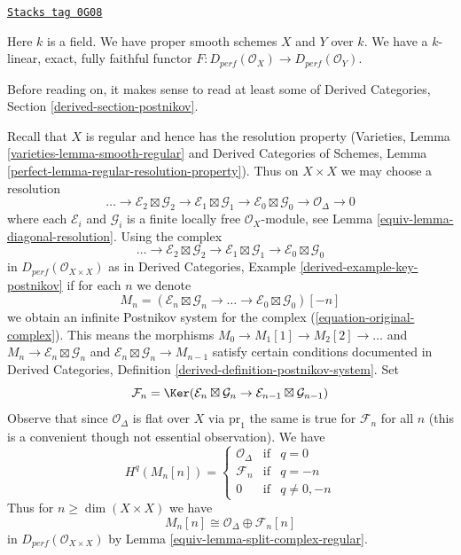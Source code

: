 \begin{definition}
\label{equiv-situation-fully-faithful}
\href{https://stacks.math.columbia.edu/tag/0G08}{\texttt{Stacks tag 0G08}}

Here $k$ is a field. We have proper smooth schemes $X$ and $Y$ over $k$.
We have a $k$-linear, exact, fully faithful functor
$F : D_{perf}(\mathcal{O}_X) \to D_{perf}(\mathcal{O}_Y)$.
\end{definition}

Before reading on, it makes sense to read at least some of
Derived Categories, Section \ref{derived-section-postnikov}.

\medskip\noindent
Recall that $X$ is regular and hence has the resolution property
(Varieties, Lemma \ref{varieties-lemma-smooth-regular} and
Derived Categories of Schemes, Lemma
\ref{perfect-lemma-regular-resolution-property}). Thus
on $X \times X$ we may choose a resolution
$$
\ldots \to
\mathcal{E}_2 \boxtimes \mathcal{G}_2 \to
\mathcal{E}_1 \boxtimes \mathcal{G}_1 \to
\mathcal{E}_0 \boxtimes \mathcal{G}_0 \to
\mathcal{O}_\Delta \to 0
$$
where each $\mathcal{E}_i$ and $\mathcal{G}_i$ is a finite locally
free $\mathcal{O}_X$-module, see Lemma \ref{equiv-lemma-diagonal-resolution}.
Using the complex
\begin{equation}
\label{equation-original-complex}
\ldots \to
\mathcal{E}_2 \boxtimes \mathcal{G}_2 \to
\mathcal{E}_1 \boxtimes \mathcal{G}_1 \to
\mathcal{E}_0 \boxtimes \mathcal{G}_0
\end{equation}
in $D_{perf}(\mathcal{O}_{X \times X})$ as in
Derived Categories, Example \ref{derived-example-key-postnikov}
if for each $n$ we denote
$$
M_n = (\mathcal{E}_n \boxtimes \mathcal{G}_n \to \ldots \to
\mathcal{E}_0 \boxtimes \mathcal{G}_0)[-n]
$$
we obtain an infinite Postnikov system for the complex
(\ref{equation-original-complex}). This means
the morphisms $M_0 \to M_1[1] \to M_2[2] \to \ldots$ and
$M_n \to \mathcal{E}_n \boxtimes \mathcal{G}_n$ and
$\mathcal{E}_n \boxtimes \mathcal{G}_n \to M_{n - 1}$
satisfy certain conditions documented in
Derived Categories, Definition \ref{derived-definition-postnikov-system}.
Set
$$
\mathcal{F}_n = \Ker(\mathcal{E}_n \boxtimes \mathcal{G}_n \to
\mathcal{E}_{n - 1} \boxtimes \mathcal{G}_{n - 1})
$$
Observe that since $\mathcal{O}_\Delta$ is flat over $X$ via $\text{pr}_1$
the same is true for $\mathcal{F}_n$ for all $n$ (this is a convenient though
not essential observation). We have
$$
H^q(M_n[n]) = \left\{
\begin{matrix}
\mathcal{O}_\Delta & \text{if} & q = 0 \\
\mathcal{F}_n & \text{if} & q = -n \\
0 & \text{if} & q \not = 0, -n
\end{matrix}
\right.
$$
Thus for $n \geq \dim(X \times X)$ we have
$$
M_n[n] \cong \mathcal{O}_\Delta \oplus \mathcal{F}_n[n]
$$
in $D_{perf}(\mathcal{O}_{X \times X})$ by
Lemma \ref{equiv-lemma-split-complex-regular}.

